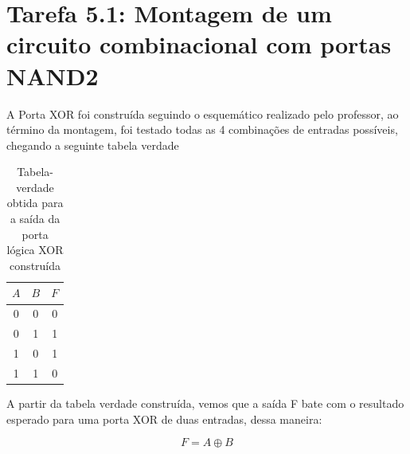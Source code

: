 \section{Tarefa 5.1: Montagem de um circuito combinacional com portas NAND2}


A Porta XOR foi construída seguindo o esquemático realizado pelo professor, ao término da montagem, foi testado todas as 4 combinações de entradas possíveis, chegando a seguinte tabela verdade

\begin{table}[H]
    \centering
    \caption{Tabela-verdade obtida para a saída da porta lógica XOR construída}
    \begin{tabular}{ccc}
        \toprule
        $A$ & $B$ & $F$ \\
        \midrule
        0   & 0   & 0   \\
        0   & 1   & 1   \\
        1   & 0   & 1   \\
        1   & 1   & 0   \\
        \bottomrule
    \end{tabular}
    \label{tab:tableXor}
\end{table}

A partir da tabela verdade construída, vemos que a saída F bate com o resultado esperado para uma porta XOR de duas entradas, dessa maneira:

\begin{equation}
    F = A \oplus B
\end{equation}